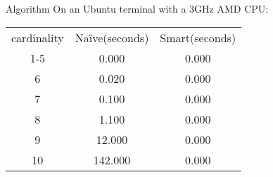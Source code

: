 \begin{frame}{Algorithm}
On an Ubuntu terminal with a 3GHz AMD CPU: \newline
    \begin{center}
        \begin{tabular}{c|c|c}
         cardinality & Naïve(seconds) & Smart(seconds) \\
         1-5 & 0.000 & 0.000 \\
         6 & 0.020 & 0.000 \\
         7 & 0.100 & 0.000 \\
         8 & 1.100 & 0.000 \\
         9 & 12.000 & 0.000 \\
         10 & 142.000 & 0.000 \\
    \end{tabular}
    \end{center}
\end{frame}


